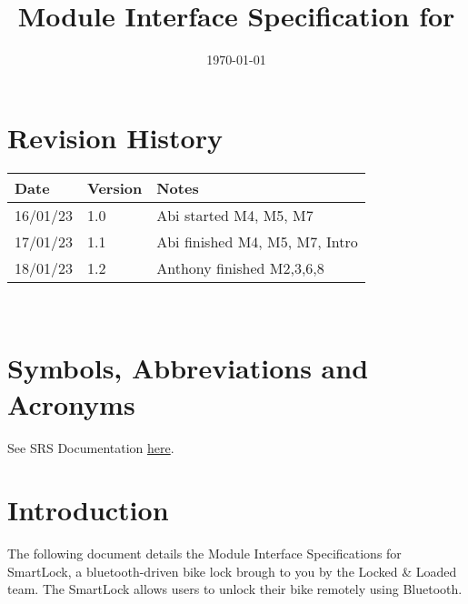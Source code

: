 \documentclass[12pt, titlepage]{article}
\begin{document}
\title{Module Interface Specification for \progname{}}

\author{\authname}

\date{\today}

\maketitle


\section{Revision History}

\begin{tabularx}{\textwidth}{p{3cm}p{2cm}X}
\toprule {\bf Date} & {\bf Version} & {\bf Notes}\\
\midrule
16/01/23 & 1.0 & Abi started M4, M5, M7\\
17/01/23  & 1.1 & Abi finished M4, M5, M7, Intro\\
18/01/23 & 1.2 & Anthony finished M2,3,6,8\\
\bottomrule
\end{tabularx}

~\newpage

\section{Symbols, Abbreviations and Acronyms}

See SRS Documentation \href{https://github.com/NevoAbigail/Capstone/blob/main/docs/SRS/SRS.pdf}{here}.


\newpage

\tableofcontents

\newpage


\section{Introduction}

The following document details the Module Interface Specifications for
SmartLock, a bluetooth-driven bike lock brough to you by the Locked \& Loaded team. The SmartLock allows users to unlock their bike remotely using Bluetooth. 

\end{document}
